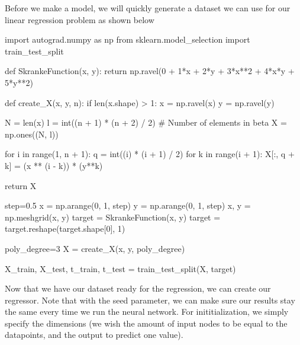 \documentclass[%
oneside,                 %
final,                   %
10pt]{article}
\begin{document}
\epycod


Before we make a model, we will quickly generate a dataset we can use
for our linear regression problem as shown below




































\bpycod
import autograd.numpy as np
from sklearn.model_selection import train_test_split

def SkrankeFunction(x, y):
    return np.ravel(0 + 1*x + 2*y + 3*x**2 + 4*x*y + 5*y**2)

def create_X(x, y, n):
    if len(x.shape) > 1:
        x = np.ravel(x)
        y = np.ravel(y)

    N = len(x)
    l = int((n + 1) * (n + 2) / 2)  # Number of elements in beta
    X = np.ones((N, l))

    for i in range(1, n + 1):
        q = int((i) * (i + 1) / 2)
        for k in range(i + 1):
            X[:, q + k] = (x ** (i - k)) * (y**k)

    return X

step=0.5
x = np.arange(0, 1, step)
y = np.arange(0, 1, step)
x, y = np.meshgrid(x, y)
target = SkrankeFunction(x, y)
target = target.reshape(target.shape[0], 1)

poly_degree=3
X = create_X(x, y, poly_degree)

X_train, X_test, t_train, t_test = train_test_split(X, target)


\epycod


Now that we have our dataset ready for the regression, we can create
our regressor. Note that with the seed parameter, we can make sure our
results stay the same every time we run the neural network. For
inititialization, we simply specify the dimensions (we wish the amount
of input nodes to be equal to the datapoints, and the output to
predict one value).
\end{document}
